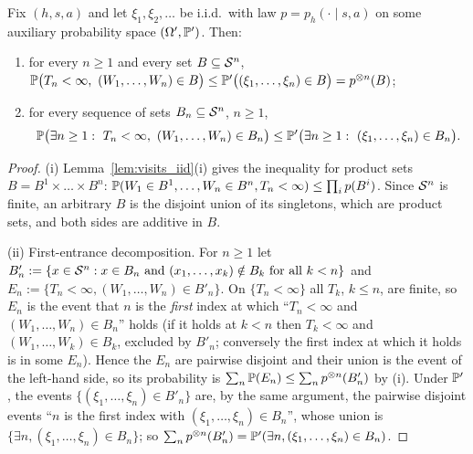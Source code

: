\begin{lemma}\label{lem:empirical_visits_domination}
\leanok
{}
Fix $(h, s, a)$ and let $\xi_1, \xi_2, \dots$ be i.i.d.\ with law $p = p_h(\cdot \mid s, a)$ on some
auxiliary probability space $(\Omega', \mathbb{P}')$. Then:
\begin{enumerate}
  \item[(i)] for every $n \ge 1$ and every set $B \subseteq \mathcal{S}^n$,
        $\mathbb{P}\big(T_n < \infty,\ (W_1, \dots, W_n) \in B\big) \le \mathbb{P}'\big((\xi_1, \dots, \xi_n) \in B\big) = p^{\otimes n}(B)$;
  \item[(ii)] for every sequence of sets $B_n \subseteq \mathcal{S}^n$, $n \ge 1$,
        \[
          \mathbb{P}\big(\exists n \ge 1 :\ T_n < \infty,\ (W_1, \dots, W_n) \in B_n\big)
          \le \mathbb{P}'\big(\exists n \ge 1 :\ (\xi_1, \dots, \xi_n) \in B_n\big) .
        \]
\end{enumerate}
\end{lemma}

\begin{proof}
\leanok
(i) Lemma~\ref{lem:visits_iid}(i) gives the inequality for product sets
$B = B^1 \times \dots \times B^n$: $\mathbb{P}(W_1 \in B^1, \dots, W_n \in B^n, T_n < \infty) \le \prod_i p(B^i)$.
Since $\mathcal{S}^n$ is finite, an arbitrary $B$ is the disjoint union of its singletons, which are
product sets, and both sides are additive in $B$.

(ii) First-entrance decomposition. For $n \ge 1$ let
$B'_n := \{x \in \mathcal{S}^n : x \in B_n \text{ and } (x_1, \dots, x_k) \notin B_k \text{ for all } k < n\}$
and $E_n := \{T_n < \infty, (W_1, \dots, W_n) \in B'_n\}$. On $\{T_n < \infty\}$ all $T_k$, $k \le n$,
are finite, so $E_n$ is the event that $n$ is the \emph{first} index at which
``$T_n < \infty$ and $(W_1, \dots, W_n) \in B_n$'' holds (if it holds at $k < n$ then $T_k < \infty$
and $(W_1, \dots, W_k) \in B_k$, excluded by $B'_n$; conversely the first index at which it holds
is in some $E_n$). Hence the $E_n$ are pairwise disjoint and their union is the event of the
left-hand side, so its probability is $\sum_n \mathbb{P}(E_n) \le \sum_n p^{\otimes n}(B'_n)$ by (i).
Under $\mathbb{P}'$, the events $\{(\xi_1, \dots, \xi_n) \in B'_n\}$ are, by the same argument, the
pairwise disjoint events ``$n$ is the first index with $(\xi_1, \dots, \xi_n) \in B_n$'', whose
union is $\{\exists n, (\xi_1, \dots, \xi_n) \in B_n\}$; so
$\sum_n p^{\otimes n}(B'_n) = \mathbb{P}'(\exists n, (\xi_1, \dots, \xi_n) \in B_n)$.
\end{proof}

